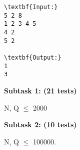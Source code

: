 \begin{verbatim}
\textbf{Input:}
5 2 8
1 2 3 4 5
4 2
5 2

\textbf{Output:}
1
3\end{verbatim}

\textbf{Subtask 1: (21 tests) }

N, Q  $\le$  2000

\textbf{Subtask 2: (10 tests) }

N, Q  $\le$  100000.

 